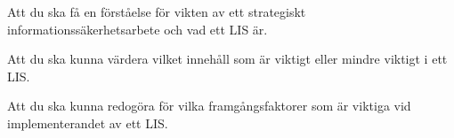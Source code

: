 \item Att du ska få en förståelse för vikten av ett strategiskt 
infor\-mations\-säker\-hets\-ar\-be\-te och vad ett LIS är.
\item Att du ska kunna värdera vilket innehåll som är viktigt eller mindre 
viktigt i ett LIS\@.
\item Att du ska kunna redogöra för vilka framgångsfaktorer som är viktiga vid 
implementerandet av ett LIS\@.
